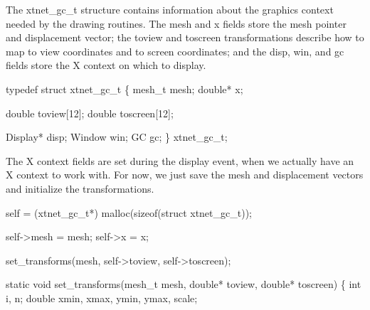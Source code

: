 \nwendcode{}\nwdocspar

The {\Tt{}xtnet{\_}gc{\_}t\nwendquote} structure contains information about the
graphics context needed by the drawing routines.
The {\Tt{}mesh\nwendquote} and {\Tt{}x\nwendquote} fields store the mesh pointer and
displacement vector; the {\Tt{}toview\nwendquote} and {\Tt{}toscreen\nwendquote} transformations
describe how to map to view coordinates and to screen coordinates;
and the {\Tt{}disp\nwendquote}, {\Tt{}win\nwendquote}, and {\Tt{}gc\nwendquote} fields store the X context
on which to display.

\nwenddocs{}\endmoddef\nwstartdeflinemarkup{}\nwenddeflinemarkup
typedef struct xtnet_gc_t \{
    mesh_t mesh;
    double* x;

    double toview[12];
    double toscreen[12];

    Display* disp;
    Window   win;
    GC       gc;
\} xtnet_gc_t;

\nwendcode{}\nwdocspar

The X context fields are set during the display event, when we actually
have an X context to work with.  For now, we just save the mesh and
displacement vectors and initialize the transformations.

\nwenddocs{}\endmoddef\nwstartdeflinemarkup{}\nwenddeflinemarkup
self = (xtnet_gc_t*) malloc(sizeof(struct xtnet_gc_t));

self->mesh = mesh;
self->x    = x;

set_transforms(mesh, self->toview, self->toscreen);
\nwendcode{}\nwdocspar

\nwenddocs{}\plusendmoddef\nwstartdeflinemarkup{}\nwenddeflinemarkup
static void set_transforms(mesh_t mesh, double* toview, double* toscreen)
\{
    int i, n;
    double xmin, xmax, ymin, ymax, scale;


